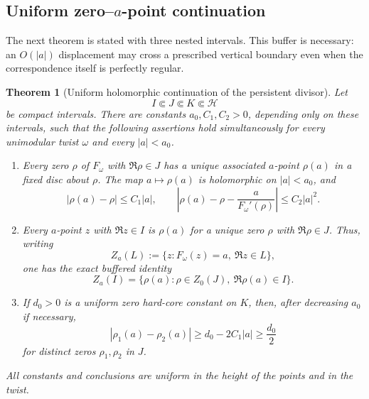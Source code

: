 \documentclass[11pt]{article}
\newtheorem{theorem}{Theorem}[section]
\theoremstyle{definition}
\theoremstyle{remark}
\begin{document}
\subsection{Uniform zero--\texorpdfstring{$a$}{a}-point continuation}

The next theorem is stated with three nested intervals.  This buffer is necessary:
an $O(|a|)$ displacement may cross a prescribed vertical boundary even when the
correspondence itself is perfectly regular.

\begin{theorem}[Uniform holomorphic continuation of the persistent divisor]
\label{thm:uniform-small-target-continuation}
Let
\[
 I\Subset J\Subset K\Subset\mathcal H
\]
be compact intervals.  There are constants $a_0,C_1,C_2>0$, depending only on these
intervals, such that the following assertions hold simultaneously for every unimodular
twist $\omega$ and every $|a|<a_0$.

\begin{enumerate}[label=\textup{(\roman*)}]
\item Every zero $\rho$ of $F_\omega$ with $\Re\rho\in J$ has a unique associated
$a$-point $\rho(a)$ in a fixed disc about $\rho$.  The map $a\mapsto\rho(a)$ is
holomorphic on $|a|<a_0$, and
\[
 |\rho(a)-\rho|\le C_1|a|,
 \qquad
 \left|\rho(a)-\rho-\frac{a}{F_\omega'(\rho)}\right|
 \le C_2|a|^2.
 \tag{ST.10}
\]

\item Every $a$-point $z$ with $\Re z\in I$ is $\rho(a)$ for a unique zero $\rho$
with $\Re\rho\in J$.  Thus, writing
\[
 Z_a(L):=\{z:F_\omega(z)=a,\ \Re z\in L\},
\]
one has the exact buffered identity
\[
 Z_a(I)
 =\{\rho(a):\rho\in Z_0(J),\ \Re\rho(a)\in I\}.
 \tag{ST.11}
\]

\item If $d_0>0$ is a uniform zero hard-core constant on $K$, then, after decreasing
$a_0$ if necessary,
\[
 |\rho_1(a)-\rho_2(a)|
 \ge d_0-2C_1|a|
 \ge \frac{d_0}{2}
 \tag{ST.12}
\]
for distinct zeros $\rho_1,\rho_2$ in $J$.
\end{enumerate}
All constants and conclusions are uniform in the height of the points and in the twist.
\end{theorem}
\end{document}
